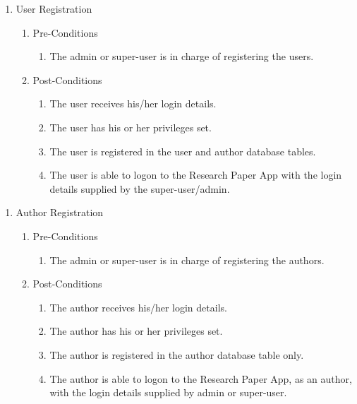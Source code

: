 \documentclass{article} %
\begin{document}
	\noindent  
	
	\begin{enumerate}
		\item  User Registration
		
		\begin{enumerate}
			\item  Pre-Conditions
			
			\begin{enumerate}
				\item  The admin or super-user is in charge of registering the users.
			\end{enumerate}
			
			\item  Post-Conditions
			
			\begin{enumerate}
				\item  The user receives his/her login details.
				
				\item  The user has his or her privileges set.
				
				\item  The user is registered in the user and author database tables.
				
				\item  The user is able to logon to the Research Paper App with the login details supplied by the super-user/admin.
			\end{enumerate}
		\end{enumerate}
	\end{enumerate}
	
	\noindent  
	
	\begin{enumerate}
		\item  Author Registration
		
		\begin{enumerate}
			\item  Pre-Conditions
			
			\begin{enumerate}
				\item  The admin or super-user is in charge of registering the authors.
			\end{enumerate}
			
			\item  Post-Conditions
			
			\begin{enumerate}
				\item  The author receives his/her login details.
				
				\item  The author has his or her privileges set.
				
				\item  The author is registered in the author database table only.
				
				\item  The author is able to logon to the Research Paper App, as an author, with the login details supplied by admin or super-user.
			\end{enumerate}
		\end{enumerate}
	\end{enumerate}
	
\end{document}
